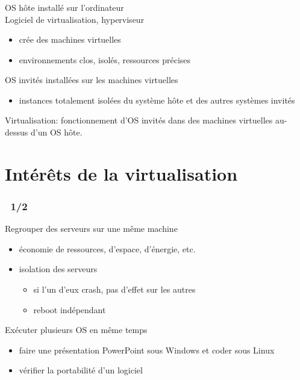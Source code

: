 \begin{frame}
\frametitle{\insertsection}
OS hôte installé sur l'ordinateur\\
\vspace{0.2cm}
Logiciel de virtualisation, \alert{hyperviseur}
\begin{itemize}
\item crée des machines virtuelles
\item[\ding{212}] environnements clos, isolés, ressources précises
\end{itemize}
\vspace{0.2cm}
OS invités installées sur les machines virtuelles  
\begin{itemize}
\item instances totalement isolées du système hôte et des autres systèmes invités
\end{itemize}
\vspace{0.5cm}

\alert{Virtualisation}: fonctionnement d'OS invités dans 
des machines virtuelles au-dessus d'un OS hôte.
\end{frame}

\section{Intérêts de la virtualisation}
\begin{frame}
  \frametitle{\insertsection ~1/2}
  Regrouper des serveurs sur une même machine
  \begin{itemize}
  \item économie de ressources, d'espace, d'énergie, etc. 
  \item isolation des serveurs
    \begin{itemize}
    \item  si l'un d'eux crash, pas d'effet sur les autres
    \item reboot indépendant 
    \end{itemize}
  \end{itemize}
  \vspace{0.5cm}

  Exécuter plusieurs OS en même temps
  \begin{itemize}
  \item faire une présentation PowerPoint sous Windows et coder sous Linux
  \item vérifier la portabilité d'un logiciel
  \end{itemize}
\end{frame}

